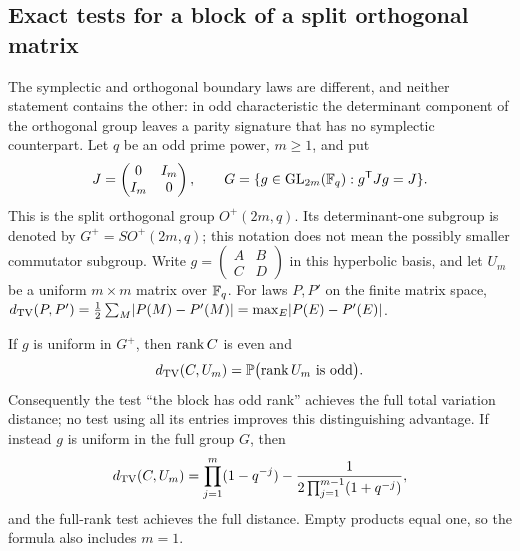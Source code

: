 
\subsection{Exact tests for a block of a split orthogonal matrix}\label{spn:sec:orthogonal}

The symplectic and orthogonal boundary laws are different, and neither
statement contains the other: in odd characteristic the determinant
component of the orthogonal group leaves a parity signature that has no
symplectic counterpart. Let $q$ be an odd prime power, $m\ge1$, and put
\[
 J=\begin{pmatrix}0&I_m\\I_m&0\end{pmatrix},\qquad
 G=\{g\in\operatorname{GL}_{2m}(\mathbb{F}_q):g^{\mathsf{T}}Jg=J\}.
\]
This is the split orthogonal group $O^+(2m,q)$. Its determinant-one subgroup
is denoted by $G^+=SO^+(2m,q)$; this notation does not mean the possibly
smaller commutator subgroup. Write
$g=\left(\begin{smallmatrix}A&B\\C&D\end{smallmatrix}\right)$ in this
hyperbolic basis, and let $U_m$ be a uniform $m\times m$ matrix over $\mathbb{F}_q$.
For laws $P,P'$ on the finite matrix space,
$d_{\mathrm{TV}}(P,P')=\frac12\sum_M\lvert P(M)-P'(M)\rvert=\max_E\lvert P(E)-P'(E)\rvert$.

\begin{theorem}\label{spn:thm:orthogonal}
If $g$ is uniform in $G^+$, then $\operatorname{rank} C$ is even and
\begin{equation}\label{spn:eq:SO-TV}
 d_{\mathrm{TV}}(C,U_m)=\mathbb{P}\bigl(\operatorname{rank} U_m\text{ is odd}\bigr).
\end{equation}
Consequently the test ``the block has odd rank'' achieves the full total
variation distance; no test using all its entries improves this
distinguishing advantage. If instead $g$ is uniform in the full group $G$,
then
\begin{equation}\label{spn:eq:O-TV}
 d_{\mathrm{TV}}(C,U_m)=\prod_{j=1}^{m}(1-q^{-j})
 -\frac{1}{2\prod_{j=1}^{m-1}(1+q^{-j})},
\end{equation}
and the full-rank test achieves the full distance. Empty products equal one,
so the formula also includes $m=1$.
\end{theorem}


